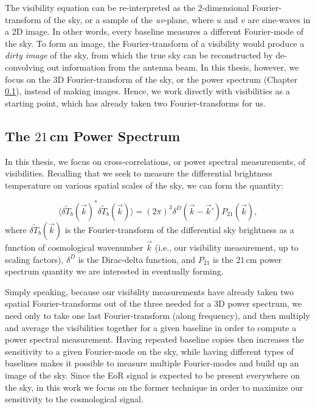 The visibility equation can be re-interpreted as the 2-dimensional Fourier-transform of the sky, or a sample of the \textit{uv}-plane, where $u$ and $v$ are sine-waves in a 2D image. In other words, every baseline measures a different Fourier-mode of the sky. To form an image, the Fourier-transform of a visibility would produce a \textit{dirty image} of the sky, from which the true sky can be reconstructed by de-convolving out information from the antenna beam. In this thesis, however, we focus on the 3D Fourier-transform of the sky, or the power spectrum (Chapter \ref{sec:PSoverview}), instead of making images. Hence, we work directly with visibilities as a starting point, which has already taken two Fourier-transforms for us. 

\subsection{The $21$\,cm Power Spectrum}
\label{sec:PSoverview}

In this thesis, we focus on cross-correlations, or power spectral measurements, of visibilities. Recalling that we seek to measure the differential brightness temperature on various spatial scales of the sky, we can form the quantity:

\begin{equation}
\label{eq:PSdef}
\langle \delta \tilde{T}_{b}(\vec{k})^{\ast} \delta \tilde{T}_{b}(\vec{k})\rangle = (2\pi)^{3} \delta^{D}(\vec{k}-\vec{k}')P_{21}(\vec{k}) ,
\end{equation}
where $\delta \tilde{T}_{b}(\vec{k})$ is the Fourier-transform of the differential sky brightness as a function of cosmological wavenumber $\vec{k}$ (i.e., our visibility measurement, up to scaling factors), $\delta^{D}$ is the Dirac-delta function, and $P_{21}$ is the $21$\,cm power spectrum quantity we are interested in eventually forming.

Simply speaking, because our visibility measurements have already taken two spatial Fourier-transforms out of the three needed for a 3D power spectrum, we need only to take one last Fourier-transform (along frequency), and then multiply and average the visibilities together for a given baseline in order to compute a power spectral measurement. Having repeated baseline copies then increases the sensitivity to a given Fourier-mode on the sky, while having different types of baselines makes it possible to measure multiple Fourier-modes and build up an image of the sky. Since the EoR signal is expected to be present everywhere on the sky, in this work we focus on the former technique in order to maximize our sensitivity to the cosmological signal.

